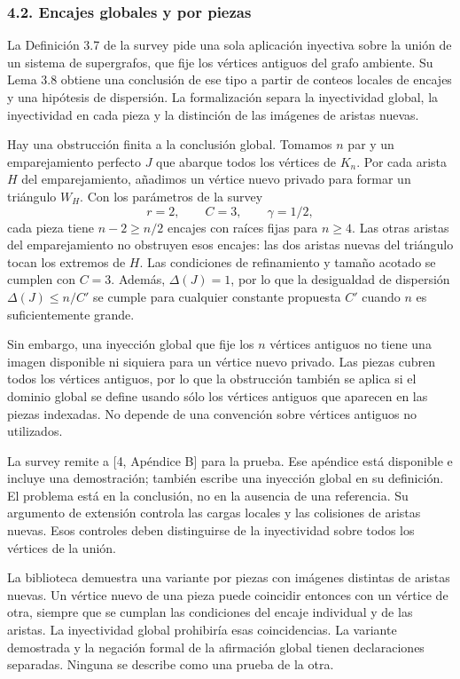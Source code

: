 \documentclass[spanish,11pt,a4paper]{article}
\begin{document}
\subsubsection{4.2. Encajes globales y por piezas}\label{encajes-globales-y-por-piezas}

La Definición 3.7 de la survey pide una sola aplicación inyectiva sobre la unión de un sistema de supergrafos, que fije los vértices antiguos del grafo ambiente. Su Lema 3.8 obtiene una conclusión de ese tipo a partir de conteos locales de encajes y una hipótesis de dispersión. La formalización separa la inyectividad global, la inyectividad en cada pieza y la distinción de las imágenes de aristas nuevas.

Hay una obstrucción finita a la conclusión global. Tomamos \(n\) par y un emparejamiento perfecto \(J\) que abarque todos los vértices de \(K_n\). Por cada arista \(H\) del emparejamiento, añadimos un vértice nuevo privado para formar un triángulo \(W_H\). Con los parámetros de la survey \[r=2,\qquad C=3,\qquad \gamma=1/2,
\tag{4.1}\] cada pieza tiene \(n-2\ge n/2\) encajes con raíces fijas para \(n\ge4\). Las otras aristas del emparejamiento no obstruyen esos encajes: las dos aristas nuevas del triángulo tocan los extremos de \(H\). Las condiciones de refinamiento y tamaño acotado se cumplen con \(C=3\). Además, \(\Delta(J)=1\), por lo que la desigualdad de dispersión \(\Delta(J)\le n/C'\) se cumple para cualquier constante propuesta \(C'\) cuando \(n\) es suficientemente grande.

Sin embargo, una inyección global que fije los \(n\) vértices antiguos no tiene una imagen disponible ni siquiera para un vértice nuevo privado. Las piezas cubren todos los vértices antiguos, por lo que la obstrucción también se aplica si el dominio global se define usando sólo los vértices antiguos que aparecen en las piezas indexadas. No depende de una convención sobre vértices antiguos no utilizados.

La survey remite a {[}4, Apéndice B{]} para la prueba. Ese apéndice está disponible e incluye una demostración; también escribe una inyección global en su definición. El problema está en la conclusión, no en la ausencia de una referencia. Su argumento de extensión controla las cargas locales y las colisiones de aristas nuevas. Esos controles deben distinguirse de la inyectividad sobre todos los vértices de la unión.

La biblioteca demuestra una variante por piezas con imágenes distintas de aristas nuevas. Un vértice nuevo de una pieza puede coincidir entonces con un vértice de otra, siempre que se cumplan las condiciones del encaje individual y de las aristas. La inyectividad global prohibiría esas coincidencias. La variante demostrada y la negación formal de la afirmación global tienen declaraciones separadas. Ninguna se describe como una prueba de la otra.
\end{document}
